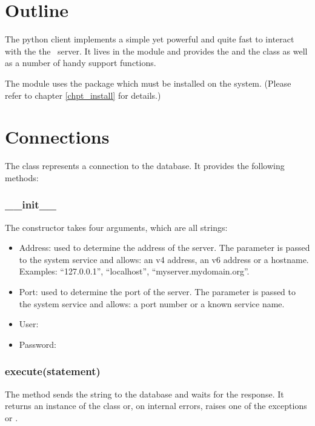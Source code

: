 \section{Outline}
The python client implements
a simple yet powerful and quite fast
 to interact
with the the \nowdb\ server.
It lives in the module  and provides
the  and the  class
as well as a number of handy support functions.

The module uses the package 
which must be installed on the system.
(Please refer to chapter
\ref{chpt_install} for details.)

\section{Connections}
The  class represents
a  connection to the
database. It provides the following 
methods:
\subsubsection{\_\_init\_\_}
The constructor takes four arguments,
which are all strings:
\begin{itemize}
\item Address:
used to determine the address of the server.
The parameter is passed to the system service
 and allows:
an v4 address,
an v6 address or
a hostname.
Examples: ``127.0.0.1'', ``localhost'',
``myserver.mydomain.org''.

\item Port:
used to determine the port of the server.
The parameter is passed to the system service
 and allows:
a port number or a known service name.

\item User:
\item Password:
\end{itemize}

\subsubsection{execute(statement)}
The method sends the string  to the database
and waits for the response.
It returns an instance of the  class
or, on internal errors, raises one of the exceptions
 or .


